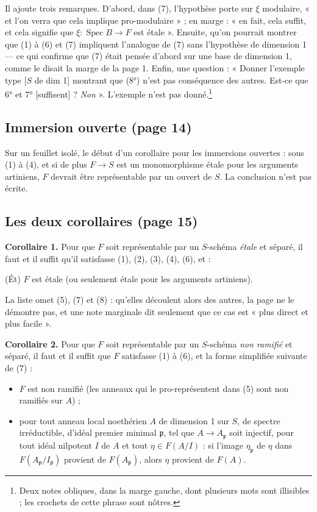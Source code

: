\documentclass[11pt,a4paper]{article}
\begin{document}
Il ajoute trois remarques. D'abord, dans (7), l'hypothèse porte sur $\xi$
modulaire, « et l'on verra que cela implique pro-modulaire » ; en marge : « en
fait, cela suffit, et cela signifie que $\xi : \operatorname{Spec} B \to F$
est étale ». Ensuite, qu'on pourrait montrer que (1) à (6) et (7) impliquent
l'analogue de (7) sans l'hypothèse de dimension 1 — ce qui confirme que (7)
était pensée d'abord sur une base de dimension 1, comme le disait la marge de
la page 1. Enfin, une question : « Donner l'exemple type [$S$ de dim 1]
montrant que (8°) n'est pas conséquence des autres. Est-ce que 6° et 7°
[suffisent] ? \emph{Non} ». L'exemple n'est pas donné.\footnote{Deux notes
obliques, dans la marge gauche, dont plusieurs mots sont illisibles ; les
crochets de cette phrase sont nôtres.}

\subsection*{Immersion ouverte (page 14)}

Sur un feuillet isolé, le début d'un corollaire pour les immersions
ouvertes : sous (1) à (4), et si de plus $F \to S$ est un monomorphisme étale
pour les arguments artiniens, $F$ devrait être représentable par un ouvert de
$S$. La conclusion n'est pas écrite.

\subsection*{Les deux corollaires (page 15)}

\textbf{Corollaire 1.} Pour que $F$ soit représentable par un $S$-schéma
\emph{étale} et séparé, il faut et il suffit qu'il satisfasse (1), (2), (3),
(4), (6), et :

(Ét) $F$ est étale (ou seulement étale pour les arguments artiniens).

La liste omet (5), (7) et (8) : qu'elles découlent alors des autres, la page
ne le démontre pas, et une note marginale dit seulement que ce cas est « plus
direct et plus facile ».

\textbf{Corollaire 2.} Pour que $F$ soit représentable par un $S$-schéma
\emph{non ramifié} et séparé, il faut et il suffit que $F$ satisfasse (1) à
(6), et la forme simplifiée suivante de (7) :
\begin{itemize}
\item[a)] $F$ est non ramifié (les anneaux qui le pro-représentent dans (5)
sont non ramifiés sur $A$) ;
\item[b)] pour tout anneau local noethérien $A$ de dimension 1 sur $S$, de
spectre irréductible, d'idéal premier minimal $\mathfrak{p}$, tel que $A \to
A_{\mathfrak{p}}$ soit injectif, pour tout idéal nilpotent $I$ de $A$ et tout
$\eta \in F(A/I)$ : si l'image $\eta_{\mathfrak{p}}$ de $\eta$ dans
$F(A_{\mathfrak{p}}/I_{\mathfrak{p}})$ provient de $F(A_{\mathfrak{p}})$,
alors $\eta$ provient de $F(A)$.
\end{itemize}
\end{document}
